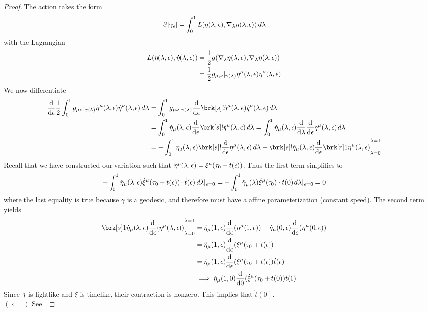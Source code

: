\begin{proof}
The action takes the form
\begin{equation}\label{}
S[\gamma_{\epsilon}] = \int_0^1 L(\eta(\lambda, \epsilon), \nabla_{\lambda} \eta(\lambda, \epsilon)) \, d\lambda
\end{equation}
with the Lagrangian
\begin{align*}
L(\eta(\lambda, \epsilon), \dot{\eta}(\lambda, \epsilon)) &= \frac{1}{2} g (\nabla_{\lambda} \eta(\lambda, \epsilon), \nabla_{\lambda} \eta(\lambda, \epsilon)) \\
&= \frac{1}{2} g_{\mu, \nu} \rvert_{\gamma(\lambda)} \dot{\eta}^{\mu} (\lambda, \epsilon) \dot{\eta}^{\nu}(\lambda, \epsilon)
\end{align*}
%
We now differentiate
\begin{align*}
\diff{}{\eps} \frac{1}{2} \int_0^1 g_{\mu \nu} \at_{\gamma(\lam)} \veta^{\mu}(\lam, \eps) \veta^{\nu}(\lam, \eps) \, d\lam
&= \int_0^1 g_{\mu \nu} \at_{\gamma(\lam)} \diff{}{\eps}\brk[s]!{\veta^{\mu}(\lam, \eps)} \veta^{\nu}(\lam, \eps) \, d\lam \\
&= \int_0^1 \veta_{\mu} (\lam, \eps) \diff{}{\eps} \brk[s]!{\veta^{\mu} (\lam, \eps)} \, d\lam
= \int_0^1 \veta_{\mu} (\lam, \eps) \diff{}{\lam} \diff{}{\eps} \eta^{\mu} (\lam, \eps) \, d\lam\\
&= - \int_0^1 \ddot{\eta_{\mu}}(\lam, \eps) \brk[s]!{\diff{}{\eps} \eta^{\mu}(\lam, \eps)} \, d\lam + \brk[s]!{\veta_{\mu} (\lam, \eps) \diff{}{\eps} \brk[r]1{\eta^{\mu}(\lam, \eps)}}^{\lam = 1}_{\lam=0}
\end{align*}
Recall that we have constructed our variation such that $\eta^{\mu}(\lambda, \epsilon) = \xi^{\mu}(\tau_0 + t(\epsilon))$. Thus the first term simplifies to
\begin{equation}\label{}
-\int_0^1 \ddot{\eta}_{\mu}(\lambda, \epsilon) \dot{\xi}^{\mu}(\tau_0 + t(\epsilon)) \cdot \dot{t}(\epsilon) \, d\lambda \rvert_{\epsilon=0} =
-\int_0^1 \ddot{\gamma}_{\mu}(\lambda) \dot{\xi}^{\mu}(\tau_0) \cdot \dot{t}(0) \, d\lambda \rvert_{\epsilon=0} = 0
\end{equation}
where the last equality is true because $\gamma$ is a geodesic, and therefore must have a affine parameterization (constant speed). The second term yields
\begin{align*}
\brk[s]1{\veta_{\mu} (\lam, \eps) \diff{}{\eps} (\eta^{\mu}(\lam, \eps))}^{\lam = 1}_{\lam = 0}
&= \veta_{\mu} (1, \eps) \diff{}{\eps} (\eta^{\mu}(1, \eps))
-  \veta_{\mu} (0, \eps) \diff{}{\eps} (\eta^{\mu}(0, \eps)) \\
&=\veta_{\mu} (1, \eps) \diff{}{\eps} (\xi^{\mu}(\tau_0 + t(\eps)) \\
&=\veta_{\mu} (1, \eps) \diff{}{\eps} (\dot{\xi}^{\mu}(\tau_0 + t(\eps)) \dot{t}(\eps) \\
&\implies \veta_{\mu} (1, 0) \diff{}{0} (\dot{\xi}^{\mu}(\tau_0 + t(0)) \dot{t}(0)
\end{align*}
Since $\dot{\eta}$ is lightlike and $\dot{\xi}$ is timelike, their contraction is nonzero. This implies that $\dot{t}(0)$.
%
\\$(\impliedby)$ See \cite{1992grle.book.....S}.
\end{proof}
